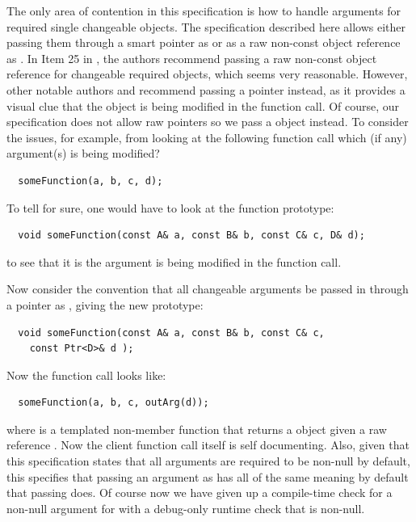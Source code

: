 \documentclass[pdf,ps2pdf,11pt]{SANDreport}
\begin{document}
The only area of contention in this specification is how to handle
arguments for required single changeable objects.  The specification
described here allows either passing them through a smart pointer as
{} or as a raw non-const object reference as
{}.  In Item 25 in {}\cite{C++CodingStandards05}, the
authors recommend passing a raw non-const object reference
{} for changeable required objects, which seems very
reasonable.  However, other notable authors {}\cite[Section Section
5.5]{stroustrup97} and {}\cite[Section 13.2]{CodeComplete2nd04}
recommend passing a pointer instead, as it provides a visual clue that
the object is being modified in the function call.  Of course, our
specification does not allow raw pointers so we pass a {} object instead.  To consider the issues, for example, from
looking at the following function call which (if any) argument(s) is
being modified?

{\small\begin{verbatim}
  someFunction(a, b, c, d);
\end{verbatim}}

To tell for sure, one would have to look at the function prototype:

{\small\begin{verbatim}
  void someFunction(const A& a, const B& b, const C& c, D& d);
\end{verbatim}}

to see that it is the {} argument is being modified in the
function call.

Now consider the convention that all changeable arguments be passed in
through a pointer as {}, giving the new
prototype:

{\small\begin{verbatim}
  void someFunction(const A& a, const B& b, const C& c,
    const Ptr<D>& d );
\end{verbatim}}

Now the function call looks like:

{\small\begin{verbatim}
  someFunction(a, b, c, outArg(d));
\end{verbatim}}

where {} is a templated non-member function that
returns a {} object given a raw reference
{}.  Now the client function call itself is self
documenting.  Also, given that this specification states that all
{} arguments are required to be non-null by default,
this specifies that passing an argument as {}
has all of the same meaning by default that passing {}
does.  Of course now we have given up a compile-time check for a
non-null argument for {} with a debug-only runtime check
that {} is non-null.
\end{document}
